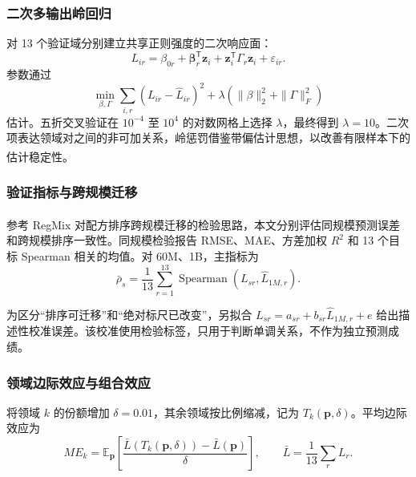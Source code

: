\documentclass[bwprint]{gmcmthesis}
\newcommand{\E}{\mathbb{E}}
\numberwithin{equation}{section}
\numberwithin{figure}{section}
\numberwithin{table}{section}
\begin{document}
        \subsubsection{二次多输出岭回归}    %
        对 13 个验证域分别建立共享正则强度的二次响应面：
        \begin{equation}
        L_{ir}=\beta_{0r}+\bm\beta_r^{\mathsf T}\bm z_i
        +\bm z_i^{\mathsf T}\Gamma_r\bm z_i+\varepsilon_{ir}.
        \label{eq:ridge}
        \end{equation}
        参数通过
        \begin{equation}
        \min_{\beta,\Gamma}\sum_{i,r}(L_{ir}-\widehat L_{ir})^2
        +\lambda\left(\|\beta\|_2^2+\|\Gamma\|_F^2\right)
        \label{eq:ridgeobjective}
        \end{equation}
        估计。五折交叉验证在 $10^{-4}$ 至 $10^4$ 的对数网格上选择 $\lambda$，最终得到 $\lambda=10$。二次项表达领域对之间的非可加关系，岭惩罚借鉴带偏估计思想，以改善有限样本下的估计稳定性\textsuperscript{\cite{hoerl1970ridge}}。

        
        \subsubsection{验证指标与跨规模迁移}  %
        参考 RegMix 对配方排序跨规模迁移的检验思路\textsuperscript{\cite{liu2025regmix}}，本文分别评估同规模预测误差和跨规模排序一致性。同规模检验报告 RMSE、MAE、方差加权 $R^2$ 和 13 个目标 Spearman 相关的均值。对 60M、1B，主指标为
        \begin{equation}
        \bar\rho_s=\frac1{13}\sum_{r=1}^{13}
        \operatorname{Spearman}(L_{sr},\widehat L_{1M,r}).
        \label{eq:spearman}
        \end{equation}
        
        为区分``排序可迁移''和``绝对标尺已改变''，另拟合
        $L_{sr}=a_{sr}+b_{sr}\widehat L_{1M,r}+e$ 给出描述性校准误差。该校准使用检验标签，只用于判断单调关系，不作为独立预测成绩。

        
        \subsubsection{领域边际效应与组合效应} %
        将领域 $k$ 的份额增加 $\delta=0.01$，其余领域按比例缩减，记为 $T_k(\bm p,\delta)$。平均边际效应为
        \begin{equation}
        ME_k=\E_{\bm p}\left[
        \frac{\bar L(T_k(\bm p,\delta))-\bar L(\bm p)}{\delta}
        \right],\qquad
        \bar L=\frac1{13}\sum_rL_r.
        \label{eq:marginal}
        \end{equation}
        
\end{document}
